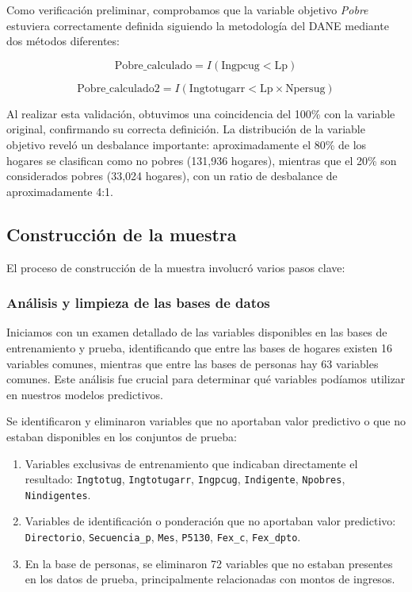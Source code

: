 \documentclass[12pt,a4paper,onecolumn]{article}
\begin{document}
Como verificación preliminar, comprobamos que la variable objetivo \textit{Pobre} estuviera correctamente definida siguiendo la metodología del DANE mediante dos métodos diferentes:

\begin{equation}
\text{Pobre\_calculado} = I(\text{Ingpcug} < \text{Lp})
\end{equation}

\begin{equation}
\text{Pobre\_calculado2} = I(\text{Ingtotugarr} < \text{Lp} \times \text{Npersug})
\end{equation}

Al realizar esta validación, obtuvimos una coincidencia del 100\% con la variable original, confirmando su correcta definición. La distribución de la variable objetivo reveló un desbalance importante: aproximadamente el 80\% de los hogares se clasifican como no pobres (131,936 hogares), mientras que el 20\% son considerados pobres (33,024 hogares), con un ratio de desbalance de aproximadamente 4:1.

\subsection{Construcción de la muestra}

El proceso de construcción de la muestra involucró varios pasos clave:

\subsubsection{Análisis y limpieza de las bases de datos}

Iniciamos con un examen detallado de las variables disponibles en las bases de entrenamiento y prueba, identificando que entre las bases de hogares existen 16 variables comunes, mientras que entre las bases de personas hay 63 variables comunes. Este análisis fue crucial para determinar qué variables podíamos utilizar en nuestros modelos predictivos.

Se identificaron y eliminaron variables que no aportaban valor predictivo o que no estaban disponibles en los conjuntos de prueba:

\begin{enumerate}
   \item Variables exclusivas de entrenamiento que indicaban directamente el resultado: \texttt{Ingtotug}, \texttt{Ingtotugarr}, \texttt{Ingpcug}, \texttt{Indigente}, \texttt{Npobres}, \texttt{Nindigentes}.
   \item Variables de identificación o ponderación que no aportaban valor predictivo: \texttt{Directorio}, \texttt{Secuencia\_p}, \texttt{Mes}, \texttt{P5130}, \texttt{Fex\_c}, \texttt{Fex\_dpto}.
   \item En la base de personas, se eliminaron 72 variables que no estaban presentes en los datos de prueba, principalmente relacionadas con montos de ingresos.
\end{enumerate}
\end{document}
